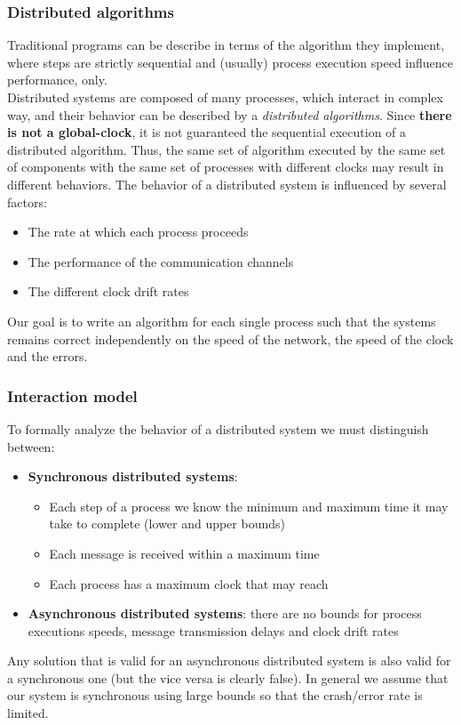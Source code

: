 \documentclass[10pt,a4paper]{article}
\begin{document}
\subsubsection{Distributed algorithms}
Traditional programs can be describe in terms of the algorithm they implement, where steps are strictly sequential and (usually) process execution speed influence performance, only. \\
Distributed systems are composed of many processes, which interact in complex way, and their behavior can be described by a \textit{distributed algorithms}. Since \textbf{there is not a global-clock}, it is not guaranteed the sequential execution of a distributed algorithm. Thus, the same set of algorithm executed by the same set of components with the same set of processes with different clocks may result in different behaviors.
The behavior of a distributed system is influenced by several factors:
\begin{itemize}
	\item The rate at which each process proceeds
	\item The performance of the communication channels
	\item The different clock drift rates
\end{itemize}
Our goal is to write an algorithm for each single process such that the systems remains correct independently on the speed of the network, the speed of the clock and the errors. \\
\subsubsection{Interaction model}
To formally analyze the behavior of a distributed system we must distinguish between:
\begin{itemize}
	\item \textbf{Synchronous distributed systems}: 
	\begin{itemize}
	\item Each step of a process we know the minimum and maximum time it may take to complete (lower and upper bounds)
	\item Each message is received within a maximum time
	\item Each process has a maximum clock that may reach
\end{itemize}
	\item \textbf{Asynchronous distributed systems}: there are no bounds for process executions speeds, message transmission delays and clock drift rates
\end{itemize}
Any solution that is valid for an asynchronous distributed system is also valid for a synchronous one (but the vice versa is clearly false). In general we assume that our system is synchronous using large bounds so that the crash/error rate is limited.
\end{document}
